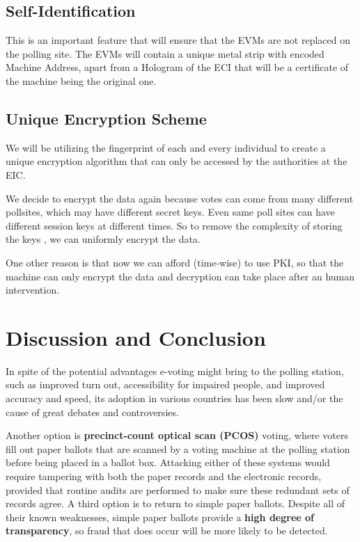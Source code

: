 \documentclass[a4paper,12pt]{extarticle}
\begin{document}
\subsection{Self-Identification}
This is an important feature that will ensure that the EVMs are not replaced on the polling site. The EVMs will contain a unique metal strip with encoded Machine Address, apart from a Hologram of the ECI that will be a certificate of the machine being the original one.

\subsection{Unique Encryption Scheme}
We will be utilizing the fingerprint of each and every individual to create a unique encryption algorithm that can only be accessed by the authorities at the EIC.

We decide to encrypt the data again because votes can come from many different pollsites, which may have different secret keys. Even same poll sites can have different session keys at different times. So to remove the complexity of storing the keys , we can uniformly encrypt the data.

One other reason is that now we can afford (time-wise) to use PKI, so that the
machine can only encrypt the data and decryption can take place after an human intervention.

\section{Discussion and Conclusion}
In spite of the potential advantages e-voting might bring to the polling station, such as improved turn out, accessibility for impaired people, and improved accuracy and speed, its adoption in various countries has been slow and/or the cause of great debates and controversies.

Another option is \textbf{precinct-count optical scan (PCOS)} voting, where voters fill out paper ballots that are scanned by a voting machine at the polling station before being placed in a ballot box. Attacking either of these systems would require tampering with both the paper records and the electronic records, provided that routine audits are performed to make sure these redundant sets of records agree. A third
option is to return to simple paper ballots. Despite all of their known weaknesses, simple paper ballots provide a \textbf{high degree of transparency}, so fraud that does occur will be more likely to be detected.
\end{document}
